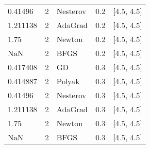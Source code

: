 \begin{tabular}{lllll}
  0.41496 &        2 & Nesterov &    0.2 &       [4.5, 4.5] \\
 1.211138 &        2 &  AdaGrad &    0.2 &       [4.5, 4.5] \\
     1.75 &        2 &   Newton &    0.2 &       [4.5, 4.5] \\
      NaN &        2 &     BFGS &    0.2 &       [4.5, 4.5] \\
 0.417408 &        2 &       GD &    0.3 &       [4.5, 4.5] \\
 0.414887 &        2 &   Polyak &    0.3 &       [4.5, 4.5] \\
  0.41496 &        2 & Nesterov &    0.3 &       [4.5, 4.5] \\
 1.211138 &        2 &  AdaGrad &    0.3 &       [4.5, 4.5] \\
     1.75 &        2 &   Newton &    0.3 &       [4.5, 4.5] \\
      NaN &        2 &     BFGS &    0.3 &       [4.5, 4.5] \\
\end{tabular}
